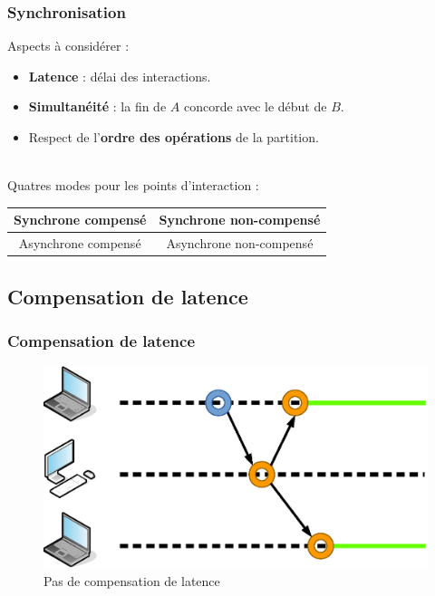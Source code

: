 \documentclass[handout]{beamer}
\begin{document}
\begin{frame}
\frametitle{Synchronisation}
\Large
Aspects à considérer : 
\large
\begin{itemize}
	\item \textbf{Latence} : délai des interactions.
	\item \textbf{Simultanéité} : la fin de $A$ concorde avec le début de $B$.
	\item Respect de l'\textbf{ordre des opérations} de la partition.
\end{itemize}
~\\
\Large Quatres modes pour les points d'interaction : 
\large
\begin{table}
	\begin{tabular}{c|c}
	Synchrone compensé & Synchrone non-compensé \\
	\midrule
	Asynchrone compensé & Asynchrone non-compensé
	\end{tabular}
\end{table}

\end{frame}

\subsection{Compensation de latence}
\begin{frame}
\frametitle{Compensation de latence}
\begin{figure}
	\centering
	\includegraphics[width=\textwidth]{draw/noncompensated.eps}
	\caption{Pas de compensation de latence}
\end{figure}
\end{frame}
\end{document}
